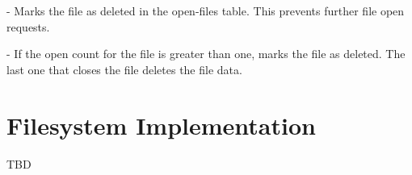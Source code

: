 \documentclass[]{article}
\begin{document}
- Marks the file as deleted in the open-files table. This prevents further
  file open requests.

- If the open count for the file is greater than one, marks the file
  as deleted. The last one that closes the file deletes the file data.


\section{Filesystem Implementation}

TBD

%
%
%
%
%
\end{document}
